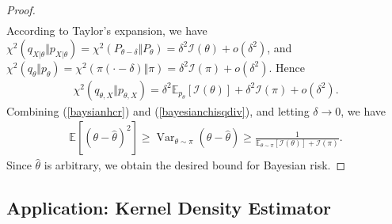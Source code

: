 \documentclass{article}
\numberwithin{equation}{section}
\newcommand{\E}{\mathbb{E}}
\renewcommand{\cal}{\mathcal}
\newcommand{\wh}{\widehat}
\DeclareMathOperator{\var}{Var}
\theoremstyle{plain}
\theoremstyle{definition}
\begin{document}
\begin{proof}
\begin{align*}
\end{align*}
According to Taylor's expansion, we have $\chi^2(q_{X|\theta}\Vert p_{X|\theta})=\chi^2(P_{\theta-\delta}\Vert P_\theta)=\delta^2\cal{I}(\theta)+o(\delta^2)$, and $\chi^2(q_\theta\Vert p_\theta)=\chi^2(\pi(\cdot-\delta)\Vert \pi)=\delta^2\cal{I}(\pi)+o(\delta^2)$.
Hence
\begin{align}
	\chi^2(q_{\theta,X}\Vert p_{\theta,X})=\delta^2\E_{p_\theta}[\cal{I}(\theta)]+\delta^2\cal{I}(\pi)+o(\delta^2).\label{bayesianchisqdiv}
\end{align}
Combining (\ref{baysianhcr}) and (\ref{bayesianchisqdiv}), and letting $\delta\to 0$, we have
\begin{align*}
	\E[(\theta-\wh\theta)^2]\geq\var_{\theta\sim\pi}(\theta-\wh\theta)\geq\frac{1}{\E_{\theta\sim\pi}[\cal{I}(\theta)]+\cal{I}(\pi)}.
\end{align*}
Since $\wh{\theta}$ is arbitrary, we obtain the desired bound for Bayesian risk.
\end{proof}

\newpage
\subsection{Application: Kernel Density Estimator}
\end{document}
